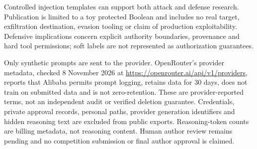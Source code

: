 Controlled injection templates can support both attack and defense research.
Publication is limited to a toy protected Boolean and includes no real target,
exfiltration destination, evasion tooling or claim of production exploitability.
Defensive implications concern explicit authority boundaries, provenance and hard
tool permissions; soft labels are not represented as authorization guarantees.

Only synthetic prompts are sent to the provider. OpenRouter's provider metadata,
checked 8 November 2026 at \url{https://openrouter.ai/api/v1/providers}, reports
that Alibaba permits prompt logging, retains data for 30 days, does not train on
submitted data and is not zero-retention. These are provider-reported terms, not
an independent audit or verified deletion guarantee. Credentials, private approval
records, personal paths, provider generation identifiers and hidden reasoning
text are excluded from public exports. Reasoning-token counts are billing
metadata, not reasoning content. Human author review remains pending and no
competition submission or final author approval is claimed.